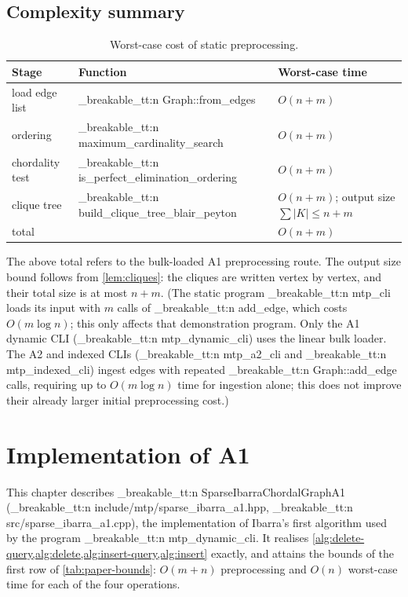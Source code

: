 \documentclass[11pt,a4paper,oneside]{report}
\theoremstyle{plain}
\theoremstyle{definition}
\theoremstyle{remark}
\DeclareRobustCommand{\code}[1]{\mtp_breakable_tt:n {#1}}
\DeclareRobustCommand{\file}[1]{\mtp_breakable_tt:n {#1}}
\begin{document}
\section{Complexity summary}
\begin{table}[ht]
\centering\small
\caption[Worst-case cost of the static preprocessing]{Worst-case cost of static
preprocessing.}\label{tab:static-cost}
\begin{tabular}{@{}lll@{}}
\toprule
\textbf{Stage} & \textbf{Function} & \textbf{Worst-case time}\\
\midrule
load edge list & \code{Graph::from_edges} & \(O(n+m)\)\\
ordering & \code{maximum_cardinality_search} & \(O(n+m)\)\\
chordality test & \code{is_perfect_elimination_ordering} & \(O(n+m)\)\\
clique tree & \code{build_clique_tree_blair_peyton} & \(O(n+m)\); output size \(\sum|K|\le n+m\)\\
\midrule
total & & \(O(n+m)\)\\
\bottomrule
\end{tabular}
\end{table}

The above total refers to the bulk-loaded A1 preprocessing route.
The output size bound follows from \cref{lem:cliques}: the cliques are written vertex by vertex,
and their total size is at most \(n+m\). (The static program \code{mtp_cli} loads its input with
\(m\) calls of \code{add_edge}, which costs \(O(m\log n)\); this only affects that
demonstration program. Only the A1 dynamic CLI (\code{mtp_dynamic_cli}) uses the linear bulk loader.
The A2 and indexed CLIs (\code{mtp_a2_cli} and \code{mtp_indexed_cli})
ingest edges with repeated \code{Graph::add_edge} calls, requiring up to
\(O(m\log n)\) time for ingestion alone; this does not improve their
already larger initial preprocessing cost.)
\chapter{Implementation of A1}\label{ch:a1}
This chapter describes \code{SparseIbarraChordalGraphA1}
(\file{include/mtp/sparse_ibarra_a1.hpp}, \file{src/sparse_ibarra_a1.cpp}), the
implementation of Ibarra's first algorithm used by the program \code{mtp_dynamic_cli}. It
realises \cref{alg:delete-query,alg:delete,alg:insert-query,alg:insert} exactly, and attains
the bounds of the first row of \cref{tab:paper-bounds}: \(O(m+n)\) preprocessing and \(O(n)\)
worst-case time for each of the four operations.
\end{document}
